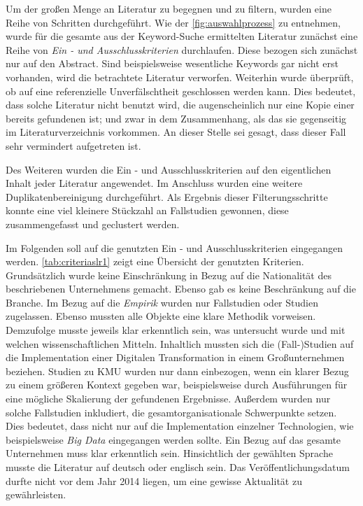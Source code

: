 Um der großen Menge an Literatur zu begegnen und zu filtern, wurden eine Reihe von Schritten durchgeführt. Wie der \ref{fig:auswahlprozess} zu entnehmen, wurde für die gesamte aus der Keyword-Suche ermittelten Literatur zunächst eine Reihe von \textit{Ein - und Ausschlusskriterien} durchlaufen. Diese bezogen sich zunächst nur auf den Abstract. Sind beispielsweise wesentliche Keywords gar nicht erst vorhanden, wird die betrachtete Literatur verworfen. Weiterhin wurde überprüft, ob auf eine referenzielle Unverfälschtheit geschlossen werden kann. Dies bedeutet, dass solche Literatur nicht benutzt wird, die augenscheinlich nur eine Kopie einer bereits gefundenen ist; und zwar in dem Zusammenhang, als das sie gegenseitig im Literaturverzeichnis vorkommen. An dieser Stelle sei gesagt, dass dieser Fall sehr vermindert aufgetreten ist. 

Des Weiteren wurden die Ein - und Ausschlusskriterien auf den eigentlichen Inhalt jeder Literatur angewendet. Im Anschluss wurden eine weitere Duplikatenbereinigung durchgeführt. Als Ergebnis dieser Filterungsschritte konnte eine viel kleinere Stückzahl an Fallstudien gewonnen, diese zusammengefasst und geclustert werden.

Im Folgenden soll auf die genutzten Ein - und Ausschlusskriterien eingegangen werden. \ref{tab:criteriaslr1} zeigt eine Übersicht der genutzten Kriterien. Grundsätzlich wurde keine Einschränkung in Bezug auf die Nationalität des beschriebenen Unternehmens gemacht. Ebenso gab es keine Beschränkung auf die Branche. Im Bezug auf die \textit{Empirik} wurden nur Fallstudien oder Studien zugelassen. Ebenso mussten alle Objekte eine klare Methodik vorweisen. Demzufolge musste jeweils klar erkenntlich sein, was untersucht wurde und mit welchen wissenschaftlichen Mitteln. Inhaltlich mussten sich die (Fall-)Studien auf die  Implementation einer Digitalen Transformation in einem Großunternehmen beziehen. Studien zu KMU wurden  nur dann einbezogen, wenn ein klarer Bezug zu einem größeren Kontext gegeben war, beispielsweise durch Ausführungen für eine mögliche Skalierung der gefundenen Ergebnisse. Außerdem wurden nur solche Fallstudien inkludiert, die gesamtorganisationale Schwerpunkte setzen. Dies bedeutet, dass nicht nur auf die Implementation einzelner Technologien, wie beispielsweise \textit{Big Data} eingegangen werden sollte. Ein Bezug auf  das gesamte Unternehmen muss klar erkenntlich sein. Hinsichtlich der gewählten Sprache musste die Literatur auf deutsch oder englisch sein. Das Veröffentlichungsdatum durfte nicht vor dem Jahr 2014 liegen, um eine gewisse Aktualität zu gewährleisten.

